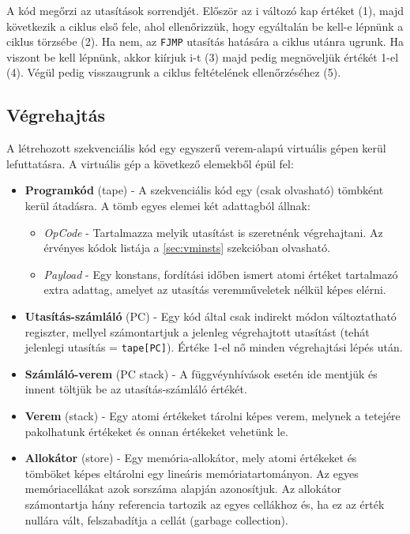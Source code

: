 A kód megőrzi az utasítások sorrendjét. Először az i változó kap értéket (1), majd következik a ciklus első fele, ahol ellenőrizzük, hogy egyáltalán be kell-e lépnünk a ciklus törzsébe (2). Ha nem, az \verb|FJMP| utasítás hatására a ciklus utánra ugrunk. Ha viszont be kell lépnünk, akkor kiírjuk i-t (3) majd pedig megnöveljük értékét 1-el (4). Végül pedig visszaugrunk a ciklus feltételének ellenőrzéséhez (5).

\subsection{Végrehajtás}

A létrehozott szekvenciális kód egy egyszerű verem-alapú virtuális gépen kerül lefuttatásra. A virtuális gép a következő elemekből épül fel:

\begin{itemize}
        \item \textbf{Programkód} (tape) - A szekvenciális kód egy (csak olvasható) tömbként kerül átadásra. A tömb egyes elemei két adattagból állnak:
        \begin{itemize}
            \item \textit{OpCode} - Tartalmazza melyik utasítást is szeretnénk végrehajtani. Az érvényes kódok listája a \ref{sec:vminsts} szekcióban olvasható.
            \item \textit{Payload} - Egy konstans, fordítási időben ismert atomi értéket tartalmazó extra adattag, amelyet az utasítás veremműveletek nélkül képes elérni. 
        \end{itemize}
        \item \textbf{Utasítás-számláló} (PC) - Egy kód által csak indirekt módon változtatható regiszter, mellyel számontartjuk a jelenleg végrehajtott utasítást (tehát jelenlegi utasítás = \verb|tape[PC]|). Értéke 1-el nő minden végrehajtási lépés után.
        \item \textbf{Számláló-verem} (PC stack) - A függvéynhívások esetén ide mentjük és innent töltjük be az utasítás-számláló értékét.
        \item \textbf{Verem} (stack) - Egy atomi értékeket tárolni képes verem, melynek a tetejére pakolhatunk értékeket és onnan értékeket vehetünk le.
        \item \textbf{Allokátor} (store) - Egy memória-allokátor, mely atomi értékeket és tömböket képes eltárolni egy lineáris memóriatartományon. Az egyes memóriacellákat azok sorszáma alapján azonosítjuk. Az allokátor számontartja hány referencia tartozik az egyes cellákhoz és, ha ez az érték nullára vált, felszabadítja a cellát (garbage collection).

\end{itemize}
